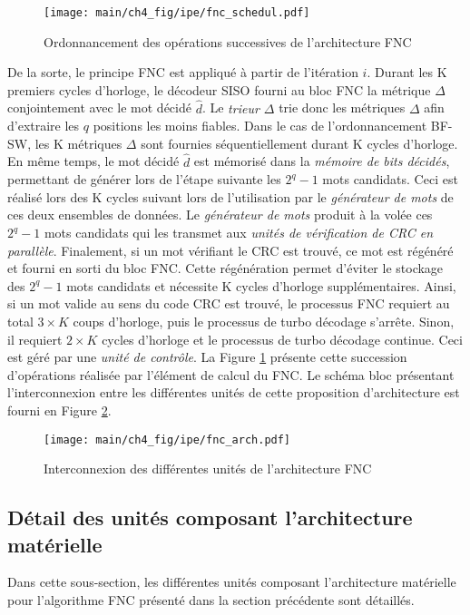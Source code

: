 \begin{figure}[!b]
	\centering
	\texttt{[image: main/ch4\_fig/ipe/fnc\_schedul.pdf]}
	\caption{Ordonnancement des opérations successives de l'architecture FNC \label{fig:fnc_schedul}}
\end{figure}

De la sorte, le principe FNC est appliqué à partir de l'itération $i$. Durant les K premiers cycles d'horloge, le 
décodeur SISO fourni au bloc FNC la métrique $\Delta$ conjointement avec le mot décidé $\hat{d}$. Le \textit{trieur 
$\Delta$} trie donc les métriques $\Delta$ afin d'extraire les $q$ positions les moins fiables. Dans le cas de 
l’ordonnancement BF-SW, les K métriques $\Delta$ sont fournies séquentiellement durant K cycles d'horloge. En même 
temps, le mot décidé $\hat{d}$ est mémorisé dans la \textit{mémoire de bits décidés}, permettant de générer lors de 
l'étape suivante les $2^q-1$ mots candidats. Ceci est réalisé lors des K cycles suivant lors de l'utilisation par le 
\textit{générateur de mots} de ces deux ensembles de données. Le \textit{générateur de mots} produit à la volée ces 
$2^q-1$ mots candidats qui les transmet aux \textit{unités de vérification de CRC en parallèle}. Finalement, si un mot 
vérifiant le CRC est trouvé, ce mot est régénéré et fourni en sorti du bloc FNC. Cette régénération permet d'éviter le 
stockage des $2^q-1$ mots candidats et nécessite K cycles d'horloge supplémentaires. Ainsi, si un mot valide au sens du
code CRC est trouvé, le processus FNC requiert au total $3\times K$ coups d'horloge, puis le processus de turbo décodage 
s'arrête. Sinon, il requiert $2\times K$ cycles d'horloge et le processus de turbo décodage continue. Ceci est géré par 
une \textit{unité de contrôle}. La Figure 
\ref{fig:fnc_schedul} présente cette succession d'opérations réalisée par l'élément de calcul du FNC. Le schéma bloc 
présentant l'interconnexion entre les différentes unités de cette proposition d'architecture est fourni en Figure 
\ref{fig:fnc_arch}. 

\begin{figure}[!h]
	\centering
	\texttt{[image: main/ch4\_fig/ipe/fnc\_arch.pdf]}
	\caption{Interconnexion des différentes unités de l'architecture FNC \label{fig:fnc_arch}}
\end{figure}

\subsection{Détail des unités composant l'architecture matérielle}
Dans cette sous-section, les différentes unités composant l'architecture matérielle pour l'algorithme FNC présenté dans 
la section précédente sont détaillés.
